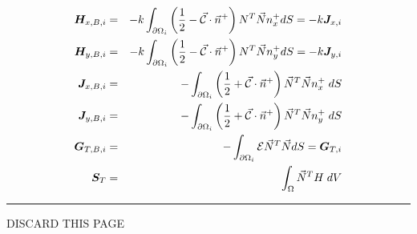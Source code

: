 \begin{footnotesize}
\begin{eqnarray}
{\bm H}_{x,B,i} &=&     -k\int_{\partial\Omega_i}  \left( \frac{1}{2} - \vec{\cal C} \cdot \vec{n}^+ \right) {N}^T \vec{N} n^+_x dS = -k {\bm J}_{x,i}\\
{\bm H}_{y,B,i} &=&     -k\int_{\partial\Omega_i}  \left( \frac{1}{2} - \vec{\cal C} \cdot \vec{n}^+ \right) {N}^T \vec{N} n^+_y dS = -k {\bm J}_{y,i}\\
{\bm J}_{x,B,i} &=&     -\int_{\partial\Omega_i} \left(\frac{1}{2} + \vec{\cal{C}} \cdot \vec{n}^+ \right) \vec{N}^T \vec{N} {n}_x^+    \; dS \\
{\bm J}_{y,B,i} &=&     -\int_{\partial\Omega_i} \left(\frac{1}{2} + \vec{\cal{C}} \cdot \vec{n}^+ \right) \vec{N}^T \vec{N} {n}_y^+    \; dS \\
{\bm G}_{T,B,i} &=&   -\int_{\partial\Omega_i}   {\cal{E}}   \vec{N}^T \vec{N} dS  = {\bm G}_{T,i}\\
{\bm S}_{T} &=&        \int_{\Omega} \vec{N}^T H  \;dV  
\end{eqnarray}
\end{footnotesize}

















\newpage
\par\noindent\rule{\textwidth}{0.4pt}
DISCARD THIS PAGE

